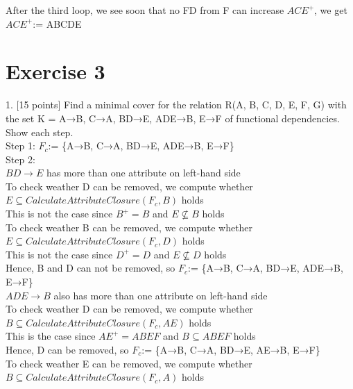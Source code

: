 \documentclass[]{article}
\begin{document}
	After the third loop, we see soon that no FD from F can increase $ACE^{+}$, we get $ACE^{+}$:= ABCDE   \\
	
	\section{Exercise 3}
	
	1. [15 points] Find a minimal cover for the relation R(A, B, C, D, E, F, G) with the set K = {A→B, C→A, BD→E, ADE→B, E→F} of functional dependencies. Show each step.    \\
	
	\noindent Step 1: $F_{c}$:= \{A→B, C→A, BD→E, ADE→B, E→F\}    \\
	
	\noindent Step 2: \\
	
	$BD\rightarrow E$ has more than one attribute on left-hand side\\
	
	To check weather D can be removed, we compute whether $E\subseteq CalculateAttributeClosure(F_{c}, B)$ holds \\
	
	This is not the case since $B^{+} = B$ and $E\not\subseteq B$ holds  \\
	
	To check weather B can be removed, we compute whether $E\subseteq CalculateAttributeClosure(F_{c}, D)$ holds \\
	
	This is not the case since $D^{+} = D$ and $E\not\subseteq D$ holds  \\
	
	Hence, B and D can not be removed, so $F_{c}$:= \{A→B, C→A, BD→E, ADE→B, E→F\} \\
	
	$ADE\rightarrow B$ also has more than one attribute on left-hand side\\
	
	To check weather D can be removed, we compute whether $B\subseteq CalculateAttributeClosure(F_{c}, AE)$ holds \\
	
	This is the case since $AE^{+} = ABEF$ and $B\subseteq ABEF$ holds  \\
	
	Hence, D can be removed, so $F_{c}$:= \{A→B, C→A, BD→E, AE→B, E→F\} \\
	
	To check weather E can be removed, we compute whether $B\subseteq CalculateAttributeClosure(F_{c}, A)$ holds \\
	
\end{document}
